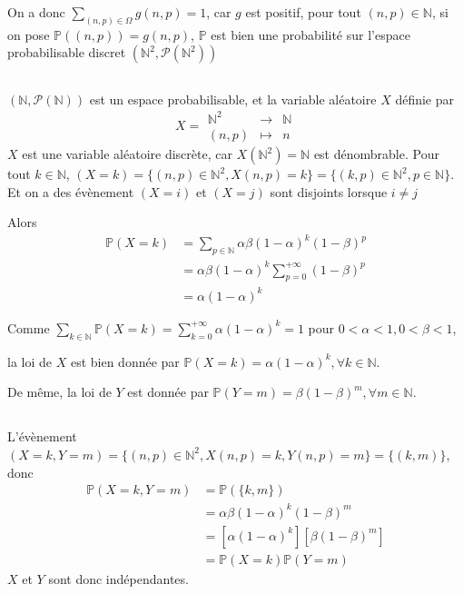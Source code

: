 \documentclass[a4paper,12pt]{book}
\begin{document}
On a donc $\sum_{(n,p) \in \Omega}g(n,p)=1$, car $g$ est positif, pour tout $(n, p) \in \mathbb{N}$, 
si on pose $\mathbb{P}({(n, p)}) = g(n, p)$, $\mathbb{P}$ est bien une probabilité sur l’espace probabilisable
discret $(\mathbb{N}^2,\mathscr{P}(\mathbb{N}^2))$
\subsection{}
$(\mathbb{N},\mathscr{P}(\mathbb{N}))$ est un espace probabilisable, et la variable aléatoire $X$ définie par
\begin{equation}  \nonumber
    X=\left.  
                 \begin{array}{ccc}  
                 \mathbb{N}^2 & \to & \mathbb{N}\\  
                 (n,p) & \mapsto & n
                 \end{array}  
    \right.  
\end{equation}
$X$ est une variable aléatoire discrète, car $X(\mathbb{N}^2)=\mathbb{N}$ est dénombrable. Pour tout $k \in\mathbb{N}$, $(X=k)=\{(n,p) \in \mathbb{N}^2, X(n,p)=k\}=\{(k,p) \in \mathbb{N}^2, p \in \mathbb{N}\}$. 
Et on a des évènement $(X=i)$ et $(X=j)$ sont disjoints lorsque $i \neq j$

Alors
\begin{align*}
    \mathbb{P}(X=k)&=\sum_{p \in \mathbb{N}}\alpha \beta (1-\alpha)^k(1-\beta)^p\\
                   &=\alpha \beta (1-\alpha)^k \sum_{p=0}^{+\infty}(1-\beta)^p\\
                   &=\alpha(1-\alpha)^k
\end{align*} 

Comme $\sum_{k \in \mathbb{N}}\mathbb{P}(X=k)=\sum_{k=0}^{+\infty}\alpha(1-\alpha)^k=1$ pour $0<\alpha <1, 0<\beta <1$, 

la loi de $X$ est bien donnée par $\boxed{\mathbb{P}(X=k)=\alpha(1-\alpha)^k, \forall k \in \mathbb{N}}$.

De même, la loi de $Y$ est donnée par $\boxed{\mathbb{P}(Y=m)=\beta (1-\beta)^m, \forall m \in \mathbb{N}}$.
\subsection{}
\subsubsection{}
L'évènement $(X=k, Y=m)=\{(n,p) \in \mathbb{N}^2, X(n,p)=k, Y(n,p)=m\}=\{(k,m)\}$, donc
\begin{align*}
    \mathbb{P}(X=k,Y=m)&=\mathbb{P}(\{k,m\})\\
                       &=\alpha \beta (1-\alpha)^k (1-\beta)^m\\
                       &=[\alpha  (1-\alpha)^k] [\beta(1-\beta)^m]\\
                       &=\mathbb{P}(X=k)\mathbb{P}(Y=m)
\end{align*}
$X$ et $Y$ sont donc indépendantes. 
\end{document}
